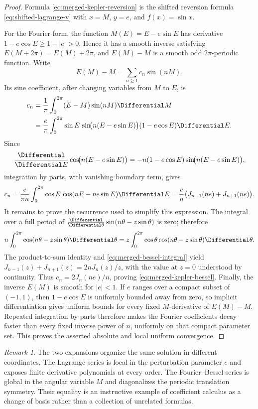 \documentclass[11pt,a4paper,oneside,openany]{book}
\theoremstyle{definition}
\theoremstyle{remark}
\newtheorem{remark}[theorem]{Remark}
\begin{document}
\begin{proof}
Formula \eqref{eq:merged-kepler-reversion} is the shifted reversion formula
\eqref{eq:shifted-lagrange-v} with $x=M$, $y=e$, and $f(x)=\sin x$.

For the Fourier form, the function $M(E)=E-e\sin E$ has derivative
$1-e\cos E\geq1-|e|>0$.  Hence it has a smooth inverse satisfying
$E(M+2\pi)=E(M)+2\pi$, and $E(M)-M$ is a smooth odd $2\pi$-periodic
function.  Write
\[
 E(M)-M=\sum_{n\geq1}c_n\sin(nM).
\]
Its sine coefficient, after changing variables from $M$ to $E$, is
\begin{align*}
 c_n
 &=\frac1\pi\int_0^{2\pi}(E-M)\sin(nM)\Differential M\\
 &=\frac e\pi\int_0^{2\pi}\sin E\,
   \sin\!\bigl(n(E-e\sin E)\bigr)(1-e\cos E)\Differential E.
\end{align*}
Since
\[
 \frac{\Differential}{\Differential E}\cos\!\bigl(n(E-e\sin E)\bigr)
 =-n(1-e\cos E)\sin\!\bigl(n(E-e\sin E)\bigr),
\]
integration by parts, with vanishing boundary term, gives
\[
 c_n=\frac e{\pi n}\int_0^{2\pi}\cos E\,
       \cos(nE-ne\sin E)\Differential E
 =\frac e n\bigl(J_{n-1}(ne)+J_{n+1}(ne)\bigr).
\]
It remains to prove the recurrence used to simplify this expression.  The
integral over a full period of
$\frac{\Differential}{\Differential\theta}\sin(n\theta-z\sin\theta)$ is zero; therefore
\[
 n\int_0^{2\pi}\cos(n\theta-z\sin\theta)\Differential\theta
 =z\int_0^{2\pi}\cos\theta\cos(n\theta-z\sin\theta)\Differential\theta.
\]
The product-to-sum identity and \eqref{eq:merged-bessel-integral} yield
$J_{n-1}(z)+J_{n+1}(z)=2nJ_n(z)/z$, with the value at $z=0$ understood by
continuity.  Thus $c_n=2J_n(ne)/n$, proving
\eqref{eq:merged-kepler-bessel}.  Finally, the inverse $E(M)$ is smooth for
$|e|<1$.  If $e$ ranges over a compact subset of $(-1,1)$, then
$1-e\cos E$ is uniformly bounded away from zero, so implicit differentiation
gives uniform bounds for every fixed $M$-derivative of $E(M)-M$.  Repeated
integration by parts therefore makes the Fourier coefficients decay faster
than every fixed inverse power of $n$, uniformly on that compact parameter
set.  This proves the asserted absolute and local uniform convergence.
\end{proof}

\begin{remark}
The two expansions organize the same solution in different coordinates.  The
Lagrange series is local in the perturbation parameter $e$ and exposes finite
derivative polynomials at every order.  The Fourier--Bessel series is global
in the angular variable $M$ and diagonalizes the periodic translation
symmetry.  Their equality is an instructive example of coefficient calculus
as a change of basis rather than a collection of unrelated formulas.
\end{remark}
\end{document}
